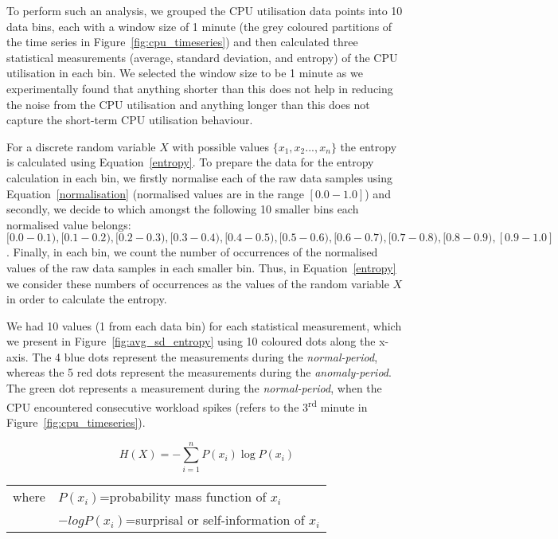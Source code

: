 To perform such an analysis, we grouped the CPU utilisation data points into 10 data bins, each with a window size of 1 minute (the grey coloured partitions of the time series in Figure~\ref{fig:cpu_timeseries}) and then calculated three statistical measurements (average, standard deviation, and entropy) of the CPU utilisation in each bin. We selected the window size to be 1 minute as we experimentally found that anything shorter than this does not help in reducing the noise from the CPU utilisation and anything longer than this does not capture the short-term CPU utilisation behaviour.  

For a discrete random variable $X$ with possible values $\big\{x_1,x_2...,x_n\big\}$ the entropy~\cite{entropy:2001} is calculated using Equation~\ref{entropy}. 
To prepare the data for the entropy calculation in each bin, we firstly normalise each of the raw data samples using Equation~\ref{normalisation} (normalised values are in the range $[0.0-1.0]$) and secondly, we decide to which amongst the following 10 smaller bins each normalised value belongs: 
$[0.0-0.1), [0.1-0.2), [0.2-0.3), [0.3-0.4), [0.4-0.5), [0.5-0.6), [0.6-0.7), [0.7-0.8), [0.8-0.9), [0.9-1.0]$. 
Finally, in each bin, we count the number of occurrences of the normalised values of the raw data samples in each smaller bin.
Thus, in Equation~\ref{entropy} we consider these numbers of occurrences as the values of the random variable $X$ in order to calculate the entropy.

We had 10 values (1 from each data bin) for each statistical measurement, which we present in Figure~\ref{fig:avg_sd_entropy} using 10 coloured dots along the x-axis. The 4 blue dots represent the measurements during the \textit{normal-period}, whereas the 5 red dots represent the measurements during the \textit{anomaly-period}. The green dot represents a measurement during the \textit{normal-period}, when the CPU encountered consecutive workload spikes (refers to the 3\textsuperscript{rd} minute in Figure~\ref{fig:cpu_timeseries}).

\begin{equation}
\label{entropy}
H(X) = -\sum\limits_{i=1}^n P(x_i)\log P(x_i)
\end{equation}
\begin{tabular}{l l}
     where &$P(x_i)$\;=\;probability mass function of $x_i$\\
                &$-logP(x_i)$\;=\;surprisal or self-information of $x_i$\\
\end{tabular}\\ 

